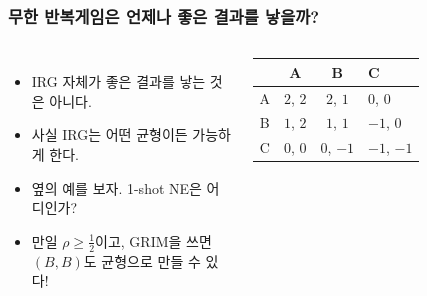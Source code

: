 \documentclass[final]{beamer}
\begin{document}
\begin{frame}\frametitle{무한 반복게임은 언제나 좋은 결과를 낳을까?}\vspace{2em}
\begin{columns}[c]
\column{14em}
\begin{itemize}
\item IRG 자체가 좋은 결과를 낳는 것은 아니다. 
\item 사실 IRG는 어떤 균형이든 가능하게 한다. 
\item 옆의 예를 보자. 1-shot NE은 어디인가?
\item 만일 $\rho \geq  \frac{1}{2}$이고, GRIM을 쓰면 $(B,B)$도 균형으로 만들 수 있다!
\end{itemize}
\column{16em}
\begin{table}
\small
\setlength{\tabcolsep}{1.2em}
\begin{tabular}{|c|c|c|l|} \hline
& {A} &  {B} & {C} \\ \hline
{A} & {$2$}, {$2$} & {$2$}, {$1$} & {$0$}, {$0$}  \\ \hline%
{B} & {$1$}, {$2$} & {$1$}, {$1$} & {$-1$}, {$0$} \\ \hline%
{C} & {$0$}, {$0$} & {$0$}, {$-1$} & {$-1$}, {$-1$} \\
\hline
\end{tabular}
\end{table}
\end{columns}
\end{frame}

\end{document}
